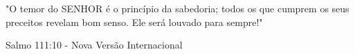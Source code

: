 \newpage
\thispagestyle{empty}
\vspace*{20cm}
\begin{flushright}
    "O temor do SENHOR é o princípio da sabedoria; todos os que cumprem os seus preceitos revelam bom senso. Ele será louvado para sempre!"

    Salmo 111:10 - Nova Versão Internacional
\end{flushright}
